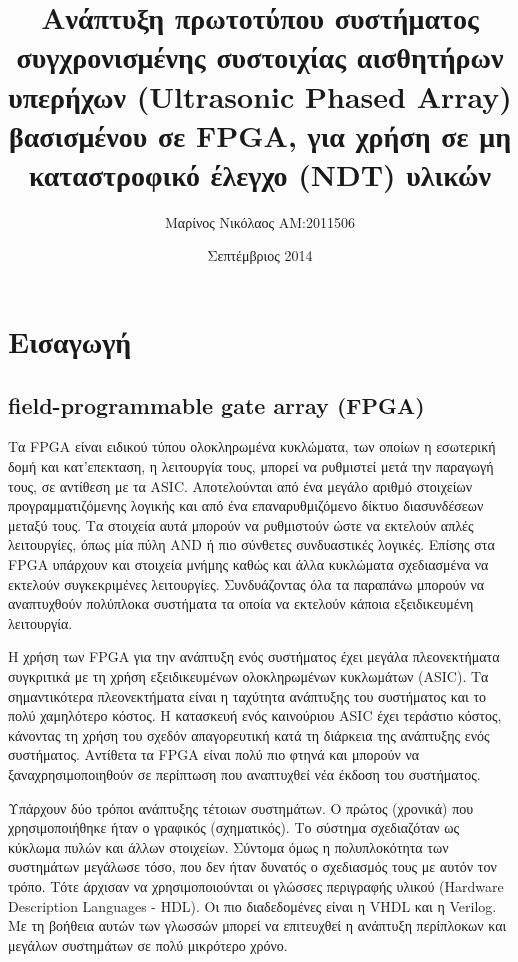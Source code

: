 \documentclass[12pt,a4paper]{book}
\title{Ανάπτυξη πρωτοτύπου συστήματος συγχρονισμένης συστοιχίας αισθητήρων υπερήχων (Ultrasonic Phased Array) βασισμένου σε FPGA, για χρήση σε μη καταστροφικό έλεγχο (NDT) υλικών}
\author{Μαρίνος Νικόλαος ΑΜ:2011506}
\date{Σεπτέμβριος 2014}
\begin{document}
{\Huge \maketitle}
\tableofcontents

\chapter{Εισαγωγή}
\section{field-programmable gate array (FPGA)}
Τα FPGA είναι ειδικού τύπου ολοκληρωμένα κυκλώματα, των οποίων η εσωτερική δομή και κατ'επεκταση, η λειτουργία τους, μπορεί να ρυθμιστεί μετά την παραγωγή τους, σε αντίθεση με τα ASIC. Αποτελούνται από ένα μεγάλο αριθμό στοιχείων προγραμματιζόμενης λογικής και από ένα επαναρυθμιζόμενο δίκτυο διασυνδέσεων μεταξύ τους. Τα στοιχεία αυτά μπορούν να ρυθμιστούν ώστε να εκτελούν απλές λειτουργίες, όπως μία πύλη AND ή πιο σύνθετες συνδυαστικές λογικές. Επίσης στα FPGA υπάρχουν και στοιχεία μνήμης καθώς και άλλα κυκλώματα σχεδιασμένα να εκτελούν συγκεκριμένες λειτουργίες. Συνδυάζοντας όλα τα παραπάνω μπορούν να αναπτυχθούν πολύπλοκα συστήματα τα οποία να εκτελούν κάποια εξειδικευμένη λειτουργία.

Η χρήση των FPGA για την ανάπτυξη ενός συστήματος έχει μεγάλα πλεονεκτήματα συγκριτικά με τη χρήση εξειδικευμένων ολοκληρωμένων κυκλωμάτων (ASIC). Τα σημαντικότερα πλεονεκτήματα είναι η ταχύτητα ανάπτυξης του συστήματος και το πολύ χαμηλότερο κόστος. Η κατασκευή ενός καινούριου ASIC έχει τεράστιο κόστος, κάνοντας τη χρήση του σχεδόν απαγορευτική κατά τη διάρκεια της ανάπτυξης ενός συστήματος. Αντίθετα τα FPGA είναι πολύ πιο φτηνά και μπορούν να ξαναχρησιμοποιηθούν σε περίπτωση που αναπτυχθεί νέα έκδοση του συστήματος.

Υπάρχουν δύο τρόποι ανάπτυξης τέτοιων συστημάτων. Ο πρώτος (χρονικά) που χρησιμοποιήθηκε ήταν ο γραφικός (σχηματικός). Το σύστημα σχεδιαζόταν ως κύκλωμα πυλών και άλλων στοιχείων. Σύντομα όμως η πολυπλοκότητα των συστημάτων μεγάλωσε τόσο, που δεν ήταν δυνατός ο σχεδιασμός τους με αυτόν τον τρόπο. Τότε άρχισαν να χρησιμοποιούνται οι γλώσσες περιγραφής υλικού (Hardware Description Languages - HDL). Οι πιο διαδεδομένες είναι η VHDL και η Verilog. Με τη βοήθεια αυτών των γλωσσών μπορεί να επιτευχθεί η ανάπτυξη περίπλοκων και μεγάλων συστημάτων σε πολύ μικρότερο χρόνο.
\end{document}
